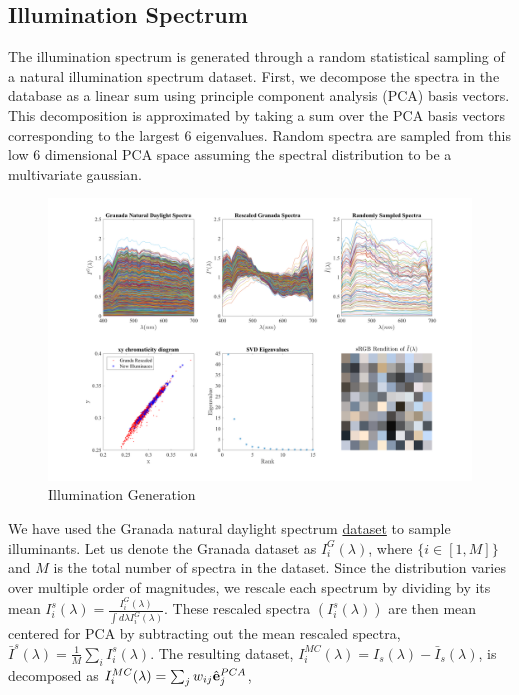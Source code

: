 \documentclass{jov}
\begin{document}
\subsection{Illumination Spectrum}
The illumination spectrum is generated through a random statistical sampling of a natural illumination spectrum dataset. First, we decompose the spectra in the database as a linear sum using principle component analysis (PCA) basis vectors. This decomposition is approximated by taking a sum over the PCA basis vectors corresponding to the largest 6 eigenvalues. Random spectra are sampled from this low 6 dimensional PCA space assuming the spectral distribution to be a multivariate gaussian.

\begin{figure}
\centering
	\includegraphics[width=\textwidth]{../Figures/Figure12/Figure12.pdf}
    \caption{Illumination Generation}
    \label{fig:illuminationGeneration}
\end{figure}
We have used the Granada natural daylight spectrum \href{http://colorimaginglab.ugr.es/pages/Data}{dataset} \cite{peyvandi2016colorimetric} to sample illuminants. Let us denote the Granada dataset as $I^G_i(\lambda)$, where $\{i \in [1,M]\}$ and $M$ is the total number of spectra in the dataset. Since the distribution varies over multiple order of magnitudes, we rescale each spectrum by dividing by its mean $I_i^s(\lambda) = \frac{I^G_i(\lambda)}{\int d\lambda I^G_i(\lambda)}$. These rescaled spectra $(I_i^s(\lambda))$ are then mean centered for PCA by subtracting out the mean 
rescaled spectra, $\bar{I}^{s}(\lambda) = \frac{1}{M}\sum_i{I_i^s(\lambda)}$. 
The resulting dataset, $I_i^{MC}(\lambda) = I_{s}(\lambda) - \bar{I}_{s}(\lambda)$, 
is decomposed as $I_i^{MC}(\lambda) = \sum_j w_{ij}\hat{{\bf e}}_j^{PCA}$, 
\end{document}

